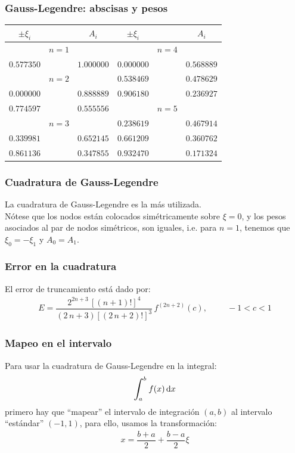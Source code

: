 \documentclass[12pt]{beamer}
\begin{document}
\begin{frame}
\frametitle{Gauss-Legendre: abscisas y pesos}
\fontsize{10}{10}\selectfont
\begin{center}
\begin{tabular}{|c c c | c c c|}
\hline
$\pm \xi_{i}$ &       & $A_{i}$    & $\pm \xi_{i}$ &       & $A_{i}$ \\ \hline
             & $n = 1$ &            &               & $n = 4$ &         \\ %
$0.577350$    &       & $1.000000$ & $0.000000$    &       & $0.568889$ \\ %
             & $n = 2$ &            & $0.538469$    &       & $0.478629$ \\ %
$0.000000$    &       & $0.888889$ & $0.906180$    &       & $0.236927$ \\ %
$0.774597$    &       & $0.555556$ &               & $n = 5$ &            \\ %
             & $n = 3$ &            & $0.238619$    &       & $0.467914$ \\ %
$0.339981$    &       & $0.652145$ & $0.661209$    &       & $0.360762$ \\ %
$0.861136$    &       & $0.347855$ & $0.932470$    &       & $0.171324$ \\ \hline
\end{tabular}
\end{center}
\end{frame}
\begin{frame}
\frametitle{Cuadratura de Gauss-Legendre}
La cuadratura de Gauss-Legendre es la más utilizada. 
\\
\bigskip
\pause
Nótese que los nodos están colocados simétricamente sobre $\xi = 0$, y los pesos asociados al par de nodos simétricos, son iguales, \pause i.e. para $n = 1$, tenemos que $\xi_{0} = - \xi_{1}$ y $A_{0} = A_{1}$.
\end{frame}
\begin{frame}
\frametitle{Error en la cuadratura}
El error de truncamiento está dado por:
\pause
\begin{align*}
E = \dfrac{2^{2n+3} \, [(n + 1)!]^{4}}{(2 \, n + 3)[(2 \, n + 2)!]^{3}} \, f^{(2n+2)} (c), \hspace{1cm} -1 < c < 1
\end{align*}
\end{frame}
\begin{frame}
\frametitle{Mapeo en el intervalo}
Para usar la cuadratura de Gauss-Legendre en la integral:
\pause
\begin{align*}
\scaleint{6ex}_{\bs a}^{b} \: f (x) \dd{x}
\end{align*}
primero hay que \enquote{mapear} el intervalo de integración $(a,b)$ al intervalo \enquote{estándar} $(-1, 1)$, \pause para ello, usamos la transformación:
\pause
\begin{align*}
x = \dfrac{b + a}{2} + \dfrac{b - a}{2} \xi
\end{align*}
\end{frame}
\end{document}
